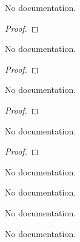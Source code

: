 \begin{theorem}\label{sub_of_sum}
        \leanok
                No documentation.
    \end{theorem}

\begin{proof}
    \leanok
\end{proof}

\begin{theorem}\label{ceil_eq_floor_add_one_iff}
        \leanok
                No documentation.
    \end{theorem}

\begin{proof}
    \leanok
\end{proof}

\begin{theorem}\label{Int.eq_of_ge_of_lt_add_one}
        \leanok
                No documentation.
    \end{theorem}

\begin{proof}
    \leanok
\end{proof}

\begin{theorem}\label{phi'_eq_ceil}
        \leanok
                No documentation.
    \end{theorem}

\begin{proof}
    \leanok
\end{proof}

\begin{theorem}\label{phi'_pos}
                No documentation.
    \end{theorem}

\begin{theorem}\label{phi'_neg_int_eq_one}
                No documentation.
    \end{theorem}

\begin{theorem}\label{phi_int_succ}
                No documentation.
    \end{theorem}

\begin{theorem}\label{phi_mono_int}
                No documentation.
    \end{theorem}

